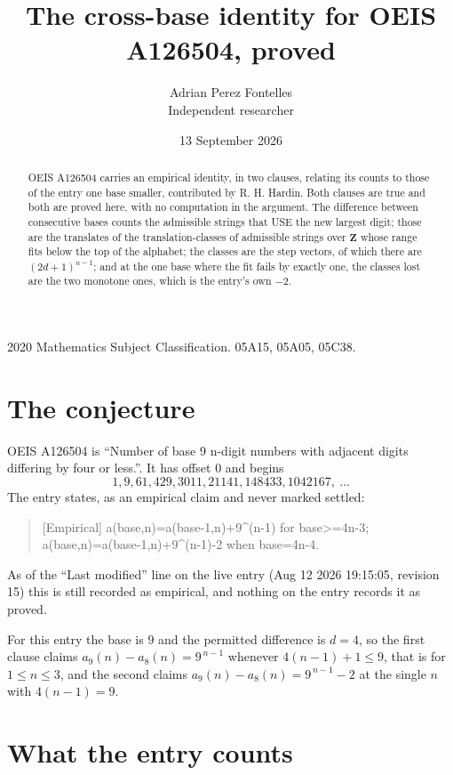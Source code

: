 \documentclass[11pt,a4paper]{article}
\title{The cross-base identity for OEIS A126504, proved}
\author{Adrian Perez Fontelles\\ \small Independent researcher}
\date{13 September 2026}
\theoremstyle{plain}
\theoremstyle{definition}
\begin{document}
\maketitle

\begin{abstract}
OEIS A126504 carries an empirical identity, in two clauses, relating its counts to those of the
entry one base smaller, contributed by R. H. Hardin. Both clauses are true and both are proved
here, with no computation in the argument. The difference between consecutive bases counts the
admissible strings that USE the new largest digit; those are the translates of the
translation-classes of admissible strings over $\mathbf{Z}$ whose range fits below the top of
the alphabet; the classes are the step vectors, of which there are $(2d+1)^{n-1}$; and at the
one base where the fit fails by exactly one, the classes lost are the two monotone ones, which
is the entry's own $-2$.
\end{abstract}

\noindent\small 2020 Mathematics Subject Classification. 05A15, 05A05, 05C38.\normalsize

\section{The conjecture}

OEIS A126504 is ``Number of base 9 n-digit numbers with adjacent digits differing by four or less.''. It has offset $0$ and begins
\[
1, 9, 61, 429, 3011, 21141, 148433, 1042167,\ \dots
\]
The entry states, as an empirical claim and never marked settled:
\begin{quote}
[Empirical] a(base,n)=a(base-1,n)+9\textasciicircum{}(n-1) for base>=4n-3; a(base,n)=a(base-1,n)+9\textasciicircum{}(n-1)-2 when base=4n-4.
\end{quote}
As of the ``Last modified'' line on the live entry (Aug 12 2026 19:15:05, revision 15)
this is still recorded as empirical, and nothing on the entry records it as proved.

For this entry the base is $9$ and the permitted difference is $d=4$, so the first clause
claims $a_{9}(n)-a_{8}(n)=9^{\,n-1}$ whenever $4(n-1)+1\le9$, that is for
$1\le n\le3$, and the second claims $a_{9}(n)-a_{8}(n)=9^{\,n-1}-2$ at the single
$n$ with $4(n-1)=9$.

\section{What the entry counts}
\end{document}
